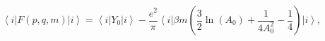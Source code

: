 \begin{equation}
\label{eq9}
\left\langle i \right|F(p,q,m)\left| i \right\rangle =
\left\langle i \right|Y_0 \left| i \right\rangle - \frac {e^2}{\pi}
\left\langle i \right|\beta m \left( \frac 32\ln(A_0)+
\frac 1{4A_0^2}-\frac 14 \right)\left| {i} \right\rangle,
\end{equation}

